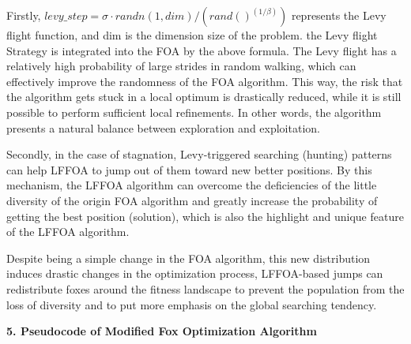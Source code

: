 \documentclass[
]{article}
\begin{document}
\begin{justify}
{Firstly, $levy\_step = \sigma \cdot randn(1, dim) / (rand()^{(1 / \beta)})$
 represents the Levy flight function, and dim is the dimension size of the problem. the Levy flight Strategy is integrated into the FOA by the above formula. The Levy flight has a relatively high probability of large strides in random walking, which can effectively improve the randomness of the FOA algorithm. This way, the risk that the algorithm gets stuck in a local optimum is drastically reduced, while it is still possible to perform sufficient local refinements. In other words, the algorithm presents a natural balance between exploration and exploitation.

Secondly, in the case of stagnation, Levy-triggered searching (hunting) patterns can help LFFOA to jump out of them toward new better positions. By this mechanism, the LFFOA algorithm can overcome the deficiencies of the little diversity of the origin FOA algorithm and greatly increase the probability of getting the best position (solution), which is also the highlight and unique feature of the LFFOA algorithm.

Despite being a simple change in the FOA algorithm, this new distribution induces drastic changes in the optimization process, LFFOA-based jumps can redistribute foxes around the fitness landscape to prevent the population from the loss of diversity and to put more emphasis on the global searching tendency.

\newpage
\begin{minipage}[t]{\textwidth}
  \textbf{5. Pseudocode of Modified Fox Optimization Algorithm}
  

\end{minipage}}
\end{justify}
\end{document}
